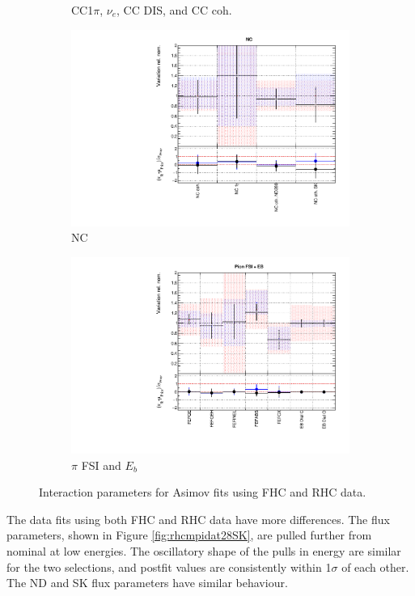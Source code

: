\begin{figure}[t]
\begin{subfigure}{0.49\textwidth}
  \caption{CC1$\pi$, $\nu_e$, CC DIS, and CC coh.}
\end{subfigure}
\begin{subfigure}{0.49\textwidth}
  \centering
  \includegraphics[width=0.95\linewidth]{figs/rhcmpasmvxsec3}
  \caption{NC}
\end{subfigure}
\begin{subfigure}{0.49\textwidth}
  \centering
  \includegraphics[width=0.95\linewidth]{figs/rhcmpasmvxsec4}
  \caption{$\pi$ FSI and $E_b$}
\end{subfigure}
\caption{Interaction parameters for Asimov fits using FHC and RHC data.}
\label{fig:rhcmpiasmvxsec}
\end{figure}

The data fits using both FHC and RHC data have more differences. The flux parameters, shown in Figure \ref{fig:rhcmpidat28SK}, are pulled further from nominal at low energies. The oscillatory shape of the pulls in energy are similar for the two selections, and postfit values are consistently within 1$\sigma$ of each other. The ND and SK flux parameters have similar behaviour.
 
